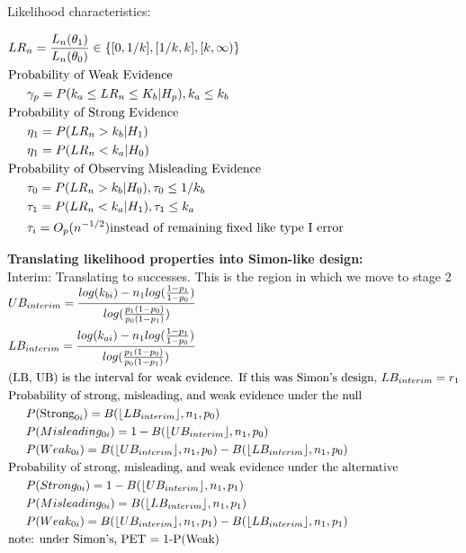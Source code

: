 \documentclass[12pt]{report}\usepackage[]{graphicx}\usepackage[]{color}
\DeclarePairedDelimiter\floor{\lfloor}{\rfloor}
\newlength{\li}\setlength{\li}{14.48pt}
\newlength{\di}\setlength{\di}{-3.5mm}
\begin{document}
\noindent Likelihood characteristics:

\vspace{3mm}
$\begin{aligned}
  &LR_n = \frac{L_n(\theta_1)}{L_n(\theta_0)} \in \left\{[0, 1/k], [1/k,k], [k, \infty)\right\} \\
  &\text{Probability of Weak Evidence} \\
  &\indent \gamma_p = P(k_a \leq LR_n \leq K_b | H_p), k_a \leq k_b \\
  &\text{Probability of Strong Evidence} \\
  &\indent \eta_1 = P(LR_n > k_b | H_1) \\
  &\indent \eta_1 = P(LR_n < k_a | H_0) \\
  &\text{Probability of Observing Misleading Evidence}\\
  &\indent \tau_0 = P(LR_n > k_b | H_0), \tau_0 \leq 1/k_b \\
  &\indent \tau_1 = P(LR_n < k_a | H_1), \tau_1 \leq k_a \\
  &\indent \tau_i = O_p(n^{-1/2}) \text{instead of remaining fixed like type I error}
\end{aligned}$

\newpage 

\noindent \textbf{Translating likelihood properties into Simon-like design:} \\
Interim: Translating to successes. This is the region in which we move to stage 2\\

$\begin{aligned}
  & UB_{interim} = \frac{log(k_{bi}) - n_1 log(\frac{1-p_1}{1-p_0})}{log(\frac{p_1(1-p_0)}{p_0(1-p_1)})} \\
  & LB_{interim} = \frac{log(k_{ai}) - n_1 log(\frac{1-p_1}{1-p_0})}{log(\frac{p_1(1-p_0)}{p_0(1-p_1)})} \\
  &\text{(LB, UB) is the interval for weak evidence. If this was Simon's design, } LB_{interim} = r_1 \\
  &\text{Probability of strong, misleading, and weak evidence under the null} \\
  &\indent P(\mbox{Strong}_{0i}) = B(\floor*{LB_{interim}}, n_1, p_0) \\
  &\indent P(Misleading_{0i}) = 1-B(\floor*{UB_{interim}}, n_1, p_0) \\
  &\indent P(Weak_{0i}) = B(\floor*{UB_{interim}}, n_1, p_0) - B(\floor*{LB_{interim}}, n_1, p_0)\\
  &\text{Probability of strong, misleading, and weak evidence under the alternative} \\
  &\indent P(Strong_{0i}) = 1-B(\floor*{UB_{interim}}, n_1, p_1) \\
  &\indent P(Misleading_{0i}) = B(\floor*{LB_{interim}}, n_1, p_1) \\
  &\indent P(Weak_{0i}) = B(\floor*{UB_{interim}}, n_1, p_1) - B(\floor*{LB_{interim}}, n_1, p_1) \\
  &\text{note: under Simon's, PET = 1-P(Weak)}
\end{aligned}$
\end{document}
